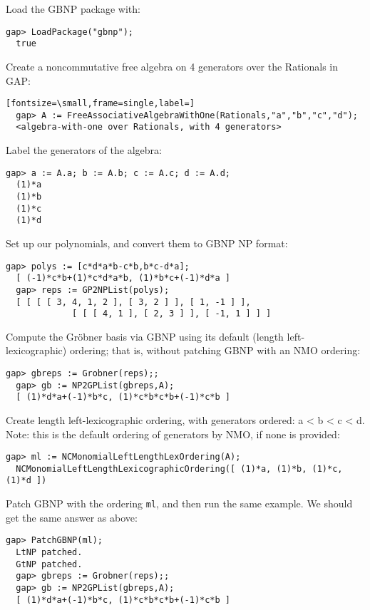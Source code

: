 \documentclass[a4paper,11pt]{report}
\begin{document}
{{{ Load the \textsf{GBNP} package with: 
\begin{Verbatim}[fontsize=\small,frame=single,label=Example]
  gap> LoadPackage("gbnp");
  true
\end{Verbatim}
 Create a noncommutative free algebra on 4 generators over the Rationals in \textsf{GAP}: 
\begin{Verbatim}[fontsize=\small,frame=single,label=]
  gap> A := FreeAssociativeAlgebraWithOne(Rationals,"a","b","c","d");
  <algebra-with-one over Rationals, with 4 generators> 
\end{Verbatim}
 Label the generators of the algebra: 
\begin{Verbatim}[fontsize=\small,frame=single,label=Example]
  gap> a := A.a; b := A.b; c := A.c; d := A.d;
  (1)*a
  (1)*b
  (1)*c
  (1)*d
\end{Verbatim}
 Set up our polynomials, and convert them to \textsf{GBNP} NP format: 
\begin{Verbatim}[fontsize=\small,frame=single,label=Example]
  gap> polys := [c*d*a*b-c*b,b*c-d*a];
  [ (-1)*c*b+(1)*c*d*a*b, (1)*b*c+(-1)*d*a ]
  gap> reps := GP2NPList(polys);
  [ [ [ [ 3, 4, 1, 2 ], [ 3, 2 ] ], [ 1, -1 ] ],
             [ [ [ 4, 1 ], [ 2, 3 ] ], [ -1, 1 ] ] ]
\end{Verbatim}
 Compute the Gr{\"o}bner basis via \textsf{GBNP} using its default (length left-lexicographic) ordering; that is, without
patching \textsf{GBNP} with an \textsf{NMO} ordering: 
\begin{Verbatim}[fontsize=\small,frame=single,label=Example]
  gap> gbreps := Grobner(reps);;
  gap> gb := NP2GPList(gbreps,A);
  [ (1)*d*a+(-1)*b*c, (1)*c*b*c*b+(-1)*c*b ]
\end{Verbatim}
 Create length left-lexicographic ordering, with generators ordered: a
{\textless} b {\textless} c {\textless} d. Note: this is the default ordering
of generators by \textsf{NMO}, if none is provided: 
\begin{Verbatim}[fontsize=\small,frame=single,label=Example]
  gap> ml := NCMonomialLeftLengthLexOrdering(A);
  NCMonomialLeftLengthLexicographicOrdering([ (1)*a, (1)*b, (1)*c, (1)*d ])
\end{Verbatim}
 Patch \textsf{GBNP} with the ordering \texttt{ml}, and then run the same example. We should get the same answer as above: 
\begin{Verbatim}[fontsize=\small,frame=single,label=Example]
  gap> PatchGBNP(ml);
  LtNP patched.
  GtNP patched.
  gap> gbreps := Grobner(reps);;
  gap> gb := NP2GPList(gbreps,A);
  [ (1)*d*a+(-1)*b*c, (1)*c*b*c*b+(-1)*c*b ]

\end{Verbatim}}}}
\end{document}
